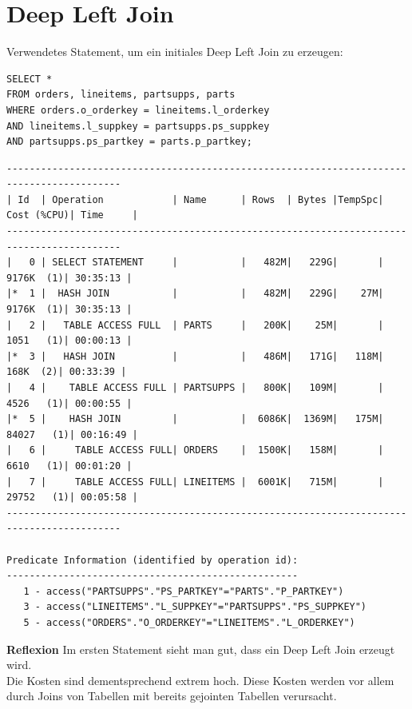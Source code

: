 \documentclass[10pt]{article}
\begin{document}
\section{Deep Left Join}
Verwendetes Statement, um ein initiales Deep Left Join zu erzeugen:
\begin{lstlisting}[style=sql]
SELECT *
FROM orders, lineitems, partsupps, parts
WHERE orders.o_orderkey = lineitems.l_orderkey
AND lineitems.l_suppkey = partsupps.ps_suppkey
AND partsupps.ps_partkey = parts.p_partkey;
\end{lstlisting}
\begin{lstlisting}[style=queryexecutionplan]
------------------------------------------------------------------------------------------
| Id  | Operation            | Name      | Rows  | Bytes |TempSpc| Cost (%CPU)| Time     |
------------------------------------------------------------------------------------------
|   0 | SELECT STATEMENT     |           |   482M|   229G|       |  9176K  (1)| 30:35:13 |
|*  1 |  HASH JOIN           |           |   482M|   229G|    27M|  9176K  (1)| 30:35:13 |
|   2 |   TABLE ACCESS FULL  | PARTS     |   200K|    25M|       |  1051   (1)| 00:00:13 |
|*  3 |   HASH JOIN          |           |   486M|   171G|   118M|   168K  (2)| 00:33:39 |
|   4 |    TABLE ACCESS FULL | PARTSUPPS |   800K|   109M|       |  4526   (1)| 00:00:55 |
|*  5 |    HASH JOIN         |           |  6086K|  1369M|   175M| 84027   (1)| 00:16:49 |
|   6 |     TABLE ACCESS FULL| ORDERS    |  1500K|   158M|       |  6610   (1)| 00:01:20 |
|   7 |     TABLE ACCESS FULL| LINEITEMS |  6001K|   715M|       | 29752   (1)| 00:05:58 |
------------------------------------------------------------------------------------------

Predicate Information (identified by operation id):
---------------------------------------------------
   1 - access("PARTSUPPS"."PS_PARTKEY"="PARTS"."P_PARTKEY")
   3 - access("LINEITEMS"."L_SUPPKEY"="PARTSUPPS"."PS_SUPPKEY")
   5 - access("ORDERS"."O_ORDERKEY"="LINEITEMS"."L_ORDERKEY")
\end{lstlisting}
\textbf{Reflexion} \newline
Im ersten Statement sieht man gut, dass ein Deep Left Join erzeugt wird.\\
Die Kosten sind dementsprechend extrem hoch. Diese Kosten werden vor allem durch Joins von Tabellen mit bereits gejointen Tabellen verursacht.
\end{document}
